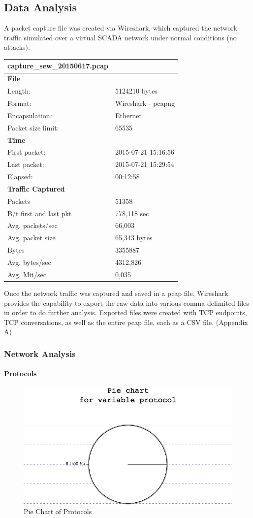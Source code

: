 \documentclass[12pt,]{article}
\begin{document}
\subsection{Data Analysis}\label{data-analysis}

A packet capture file was created via Wireshark, which captured the
network traffic simulated over a virtual SCADA network under normal
conditions (no attacks).

\begin{longtable}[c]{@{}ll@{}}
\toprule
\textbf{capture\_sew\_20150617.pcap} &\tabularnewline
\midrule
\endhead
\textbf{File} &\tabularnewline
Length: & 5124210 bytes\tabularnewline
Format: & Wireshark - pcapng\tabularnewline
Encapsulation: & Ethernet\tabularnewline
Packet size limit: & 65535\tabularnewline
\textbf{Time} &\tabularnewline
First packet: & 2015-07-21 15:16:56\tabularnewline
Last packet: & 2015-07-21 15:29:54\tabularnewline
Elapsed: & 00:12:58\tabularnewline
\textbf{Traffic Captured} &\tabularnewline
Packets & 51358\tabularnewline
B/t first and last pkt & 778,118 sec\tabularnewline
Avg. packets/sec & 66,003\tabularnewline
Avg. packet size & 65,343 bytes\tabularnewline
Bytes & 3355887\tabularnewline
Avg. bytes/sec & 4312,826\tabularnewline
Avg. Mit/sec & 0,035\tabularnewline
\bottomrule
\end{longtable}

Once the network traffic was captured and saved in a pcap file,
Wireshark provides the capability to export the raw data into various
comma delimited files in order to do further analysis. Exported files
were created with TCP endpoints, TCP conversations, as well as the
entire pcap file, each as a CSV file. (Appendix A)

\subsubsection{Network Analysis}\label{network-analysis}

\paragraph{Protocols}\label{protocols-1}

\begin{figure}

{\centering \includegraphics{thesis_files/figure-latex/unnamed-chunk-15-1} 

}

\caption{Pie Chart of Protocols}\label{fig:unnamed-chunk-15}
\end{figure}
\end{document}
